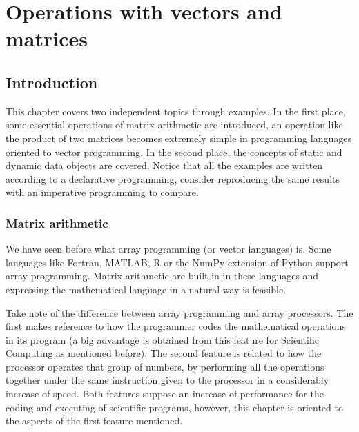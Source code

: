 \chapter{Operations with vectors and matrices}    \label{chap:matrices}


\vspace{-.7cm}
\section{Introduction}

This chapter covers two independent topics through examples. In the first place, some essential 
operations of matrix arithmetic are introduced, an operation like the product of two matrices becomes 
extremely simple in programming languages oriented to vector programming. 
In the second place, the concepts of static and dynamic 
data objects are covered. Notice that all the examples are written according to a 
declarative programming, consider reproducing the same results with an imperative programming to 
compare.
    
    \vspace{-.3cm}
    \subsection*{Matrix arithmetic}
    \vspace{-.2cm}

We have seen before what array programming (or vector languages) is.
Some languages like Fortran, MATLAB, R or the NumPy extension of Python support array programming.
Matrix arithmetic are built-in in these languages and expressing the mathematical language in a natural way is feasible.

Take note of the difference between array programming and array processors. The first makes reference to how the programmer 
codes the mathematical operations in its program (a big advantage is obtained from this feature for Scientific Computing as mentioned before). 
The second feature is related to how the processor operates that group of numbers, by performing
all the operations together under the same instruction given to the processor in a considerably increase of speed.
Both features suppose an increase of performance for the coding and executing of scientific programs, however, this chapter is 
oriented to the aspects of the first feature mentioned. 

